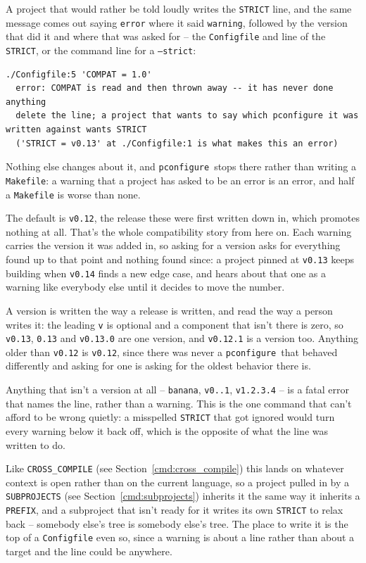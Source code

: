 \documentclass{article}
\newcommand{\pconfigure}{\texttt{pconfigure}}
\begin{document}
A project that would rather be told loudly writes the \texttt{STRICT}
line, and the same message comes out saying \texttt{error} where it
said \texttt{warning}, followed by the version that did it and where
that was asked for -- the \texttt{Configfile} and line of the
\texttt{STRICT}, or the command line for a \texttt{--strict}:

\begin{verbatim}
./Configfile:5 'COMPAT = 1.0'
  error: COMPAT is read and then thrown away -- it has never done anything
  delete the line; a project that wants to say which pconfigure it was written against wants STRICT
  ('STRICT = v0.13' at ./Configfile:1 is what makes this an error)
\end{verbatim}

Nothing else changes about it, and \pconfigure\ stops there rather than writing a
\texttt{Makefile}: a warning that a project has asked to be an error
is an error, and half a \texttt{Makefile} is worse than none.

The default is \texttt{v0.12}, the release these were first written
down in, which promotes nothing at all.  That's the whole
compatibility story from here on.  Each warning carries the version it
was added in, so asking for a version asks for everything found up to
that point and nothing found since: a project pinned at
\texttt{v0.13} keeps building when \texttt{v0.14} finds a new edge
case, and hears about that one as a warning like everybody else until
it decides to move the number.

A version is written the way a release is written, and read the way a
person writes it: the leading \texttt{v} is optional and a component
that isn't there is zero, so \texttt{v0.13}, \texttt{0.13} and
\texttt{v0.13.0} are one version, and \texttt{v0.12.1} is a version
too.  Anything older than \texttt{v0.12} is \texttt{v0.12}, since
there was never a \pconfigure\ that behaved differently and asking for
one is asking for the oldest behavior there is.

Anything that isn't a version at all -- \texttt{banana},
\texttt{v0..1}, \texttt{v1.2.3.4} -- is a fatal error that names the
line, rather than a warning.  This is the one command that can't
afford to be wrong quietly: a misspelled \texttt{STRICT} that got
ignored would turn every warning below it back off, which is the
opposite of what the line was written to do.

Like \texttt{CROSS\_COMPILE} (see Section~\ref{cmd:cross_compile})
this lands on whatever context is open rather than on the current
language, so a project pulled in by a \texttt{SUBPROJECTS} (see
Section~\ref{cmd:subprojects}) inherits it the same way it inherits a
\texttt{PREFIX}, and a subproject that isn't ready for it writes its
own \texttt{STRICT} to relax back -- somebody else's tree is somebody
else's tree.  The place to write it is the top of a
\texttt{Configfile} even so, since a warning is about a line rather
than about a target and the line could be anywhere.
\end{document}
